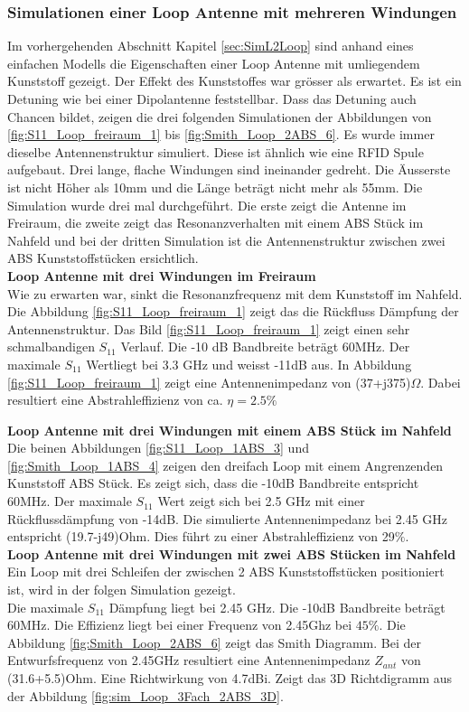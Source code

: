 \subsubsection{Simulationen einer Loop Antenne mit mehreren Windungen}
Im vorhergehenden Abschnitt Kapitel \ref{sec:SimL2Loop} sind anhand eines einfachen Modells die Eigenschaften einer Loop Antenne mit umliegendem Kunststoff gezeigt. Der Effekt des Kunststoffes war grösser als erwartet. Es ist ein Detuning wie bei einer Dipolantenne feststellbar. Dass das Detuning auch Chancen bildet, zeigen die drei folgenden Simulationen der Abbildungen von \ref{fig:S11_Loop_freiraum_1} bis \ref{fig:Smith_Loop_2ABS_6}. Es wurde immer dieselbe Antennenstruktur simuliert. Diese ist ähnlich wie eine RFID Spule aufgebaut. Drei lange, flache Windungen sind ineinander gedreht. Die Äusserste ist nicht Höher als 10mm und die Länge beträgt nicht mehr als 55mm. Die Simulation wurde drei mal durchgeführt. Die erste zeigt die Antenne im Freiraum, die zweite zeigt das Resonanzverhalten mit einem ABS Stück im Nahfeld und bei der dritten Simulation ist die Antennenstruktur zwischen zwei ABS Kunststoffstücken ersichtlich.\\

\textbf{Loop Antenne mit drei Windungen im Freiraum}\\
Wie zu erwarten war, sinkt die Resonanzfrequenz mit dem Kunststoff im Nahfeld. Die Abbildung \ref{fig:S11_Loop_freiraum_1} zeigt das die Rückfluss Dämpfung der Antennenstruktur. Das Bild \ref{fig:S11_Loop_freiraum_1} zeigt einen sehr schmalbandigen $S_{11}$ Verlauf. Die -10 dB Bandbreite beträgt 60MHz. Der maximale $S_{11}$ Wertliegt bei 3.3 GHz und weisst -11dB aus. In Abbildung \ref{fig:S11_Loop_freiraum_1} zeigt eine Antennenimpedanz von (37+j375)$\Omega$. Dabei resultiert eine Abstrahleffizienz von ca. $\eta=2.5\%$


\textbf{Loop Antenne mit drei Windungen mit einem ABS Stück im Nahfeld}\\
Die beinen Abbildungen \ref{fig:S11_Loop_1ABS_3} und \ref{fig:Smith_Loop_1ABS_4} zeigen den dreifach Loop mit einem Angrenzenden Kunststoff ABS Stück. Es zeigt sich, dass die -10dB Bandbreite entspricht 60MHz. Der maximale $S_{11}$ Wert zeigt sich bei 2.5 GHz mit einer Rückflussdämpfung von -14dB. Die simulierte Antennenimpedanz bei 2.45 GHz entspricht (19.7-j49)Ohm. Dies führt zu einer Abstrahleffizienz von 29$\%$.\\

\textbf{Loop Antenne mit drei Windungen mit zwei ABS Stücken im Nahfeld}\\
Ein Loop mit drei Schleifen der zwischen 2 ABS Kunststoffstücken positioniert ist, wird in der folgen Simulation gezeigt.\\
Die maximale $S_{11}$ Dämpfung liegt bei 2.45 GHz. Die -10dB Bandbreite beträgt 60MHz. Die Effizienz liegt bei einer Frequenz von 2.45Ghz bei $45\%$. Die Abbildung \ref{fig:Smith_Loop_2ABS_6} zeigt das Smith Diagramm. Bei der Entwurfsfrequenz von 2.45GHz resultiert eine Antennenimpedanz $Z_{ant}$ von (31.6+5.5)Ohm.
Eine Richtwirkung von 4.7dBi. Zeigt das 3D Richtdigramm aus der Abbildung \ref{fig:sim_Loop_3Fach_2ABS_3D}.

